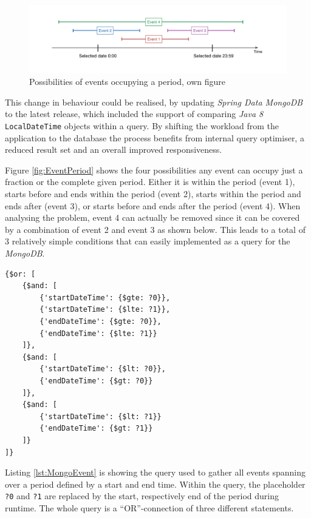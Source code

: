 \begin{figure}[h]
  	\centering
  	\includegraphics[width=0.9\linewidth]{./images/event-period.png}
  	\caption{Possibilities of events occupying a period, own figure}
	\label{fig:EventPeriod}
\end{figure}

This change in behaviour could be realised, by updating \emph{Spring Data MongoDB} to the latest release, which included the support of comparing \emph{Java 8} \texttt{LocalDateTime} objects within a query. By shifting the workload from the application to the database the process benefits from internal query optimiser, a reduced result set and an overall improved responsiveness. 

Figure \vref{fig:EventPeriod} shows the four possibilities any event can occupy just a fraction or the complete given period. Either it is within the period (event 1), starts before and ends within the period (event 2), starts within the period and ends after (event 3), or starts before and ends after the period (event 4). When analysing the problem, event 4 can actually be removed since it can be covered by a combination of event 2 and event 3 as shown below. This leads to a total of 3 relatively simple conditions that can easily implemented as a query for the \emph{MongoDB}.

\begin{lstlisting}[caption ={MongoDB query for getting events over a period}, label=lst:MongoEvent]
{$or: [
	{$and: [
		{'startDateTime': {$gte: ?0}},
		{'startDateTime': {$lte: ?1}},
		{'endDateTime': {$gte: ?0}},
		{'endDateTime': {$lte: ?1}}
	]},
	{$and: [
		{'startDateTime': {$lt: ?0}},
		{'endDateTime': {$gt: ?0}}
	]},
	{$and: [
		{'startDateTime': {$lt: ?1}}
		{'endDateTime': {$gt: ?1}}
	]}
]}
\end{lstlisting}

Listing \ref{lst:MongoEvent} is showing the query used to gather all events spanning over a period defined by a start and end time. Within the query, the placeholder \texttt{?0} and \texttt{?1} are replaced by the start, respectively end of the period during runtime. The whole query is a \enquote{OR}-connection of three different statements. 

